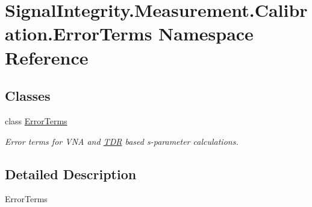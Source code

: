 \hypertarget{namespaceSignalIntegrity_1_1Measurement_1_1Calibration_1_1ErrorTerms}{}\section{Signal\+Integrity.\+Measurement.\+Calibration.\+Error\+Terms Namespace Reference}
\label{namespaceSignalIntegrity_1_1Measurement_1_1Calibration_1_1ErrorTerms}
\subsection*{Classes}
\begin{DoxyCompactItemize}
\item 
class \hyperlink{classSignalIntegrity_1_1Measurement_1_1Calibration_1_1ErrorTerms_1_1ErrorTerms}{Error\+Terms}
\begin{DoxyCompactList}\small\item\em Error terms for V\+NA and \hyperlink{namespaceSignalIntegrity_1_1Measurement_1_1TDR}{T\+DR} based s-\/parameter calculations. \end{DoxyCompactList}\end{DoxyCompactItemize}


\subsection{Detailed Description}
\begin{DoxyVerb}ErrorTerms\end{DoxyVerb}
 